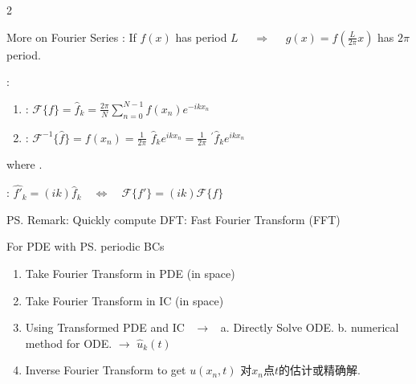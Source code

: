 \documentclass{note}
\begin{document}
\begin{multicols}{2}
{{\begin{MyTh}{More on Fourier Series}
        \quad {}: If $f(x)$ has period $L$ \ \ $\Rightarrow$ \ \ $g(x)=f(\frac{L}{2\pi}x)$ has $2\pi$ period.
    \end{MyTh}

    \begin{MyTh}{} \tiny
        :

        \vspace{-1pt}
        \begin{enumerate}
            \item {}: $\mathcal{F}\{f\}=\widehat{f}_k = \frac{2\pi}{N}\sum_{n=0}^{N-1} f(x_n) e^{-i k x_n}$ \quad {}
            \item {}: $\mathcal{F}^{-1}\{\widehat{f}\} = f(x_n) = \frac{1}{2\pi}$  $ \widehat{f}_k e^{i k x_n} = \frac{1}{2\pi}$  ${}^{\prime}\!\widehat{f}_k e^{i k x_n}$
        \end{enumerate}

        \quad where .
        
        \quad {}: $\widehat{f'}_k = (ik)\widehat{f}_k \quad \Leftrightarrow \quad \mathcal{F}\{f'\}= \left(ik\right)\mathcal{F}\{f\}$

        \vspace{1pt}
        \quad \ps{Remark}: Quickly compute DFT: Fast Fourier Transform (FFT)
    \end{MyTh}

    \begin{MyTh}{} \tiny
        For PDE with \ps{periodic BCs}
        
        \vspace{-2pt}
        \begin{enumerate}
            \item Take Fourier Transform in PDE (in space) \qquad {}
            \vspace{-2pt}
            \item Take Fourier Transform in IC (in space) \qquad {}
            \vspace{-2pt}
            \item Using Transformed PDE and IC \ $\to$ \ a. Directly Solve ODE. \quad b. numerical method for ODE. $\to$ $\widehat{u}_k(t)$
            \vspace{-2pt}
            \item Inverse Fourier Transform to get $u(x_n,t)$ 对$x_n$点$t$的估计或精确解.
        \end{enumerate}        
    \end{MyTh}

}}
\end{multicols}
\end{document}
